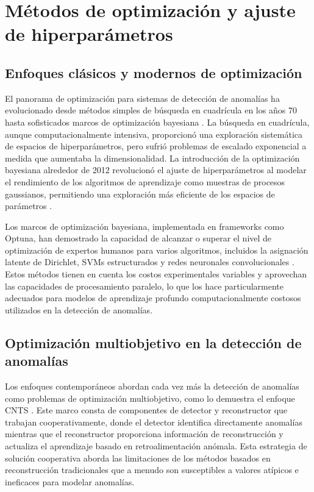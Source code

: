 \section{Métodos de optimización y ajuste de hiperparámetros}
\subsection{Enfoques clásicos y modernos de optimización}

El panorama de optimización para sistemas de detección de anomalías ha evolucionado desde métodos simples de búsqueda en cuadrícula en los años 70 \cite{noauthor_adaptation_nodate} hasta sofisticados marcos de optimización bayesiana \cite{snoek_practical_2012}. La búsqueda en cuadrícula, aunque computacionalmente intensiva, proporcionó una exploración sistemática de espacios de hiperparámetros, pero sufrió problemas de escalado exponencial a medida que aumentaba la dimensionalidad. La introducción de la optimización bayesiana alrededor de 2012 revolucionó el ajuste de hiperparámetros al modelar el rendimiento de los algoritmos de aprendizaje como muestras de procesos gaussianos, permitiendo una exploración más eficiente de los espacios de parámetros \cite{noauthor_adaptation_nodate}.

Los marcos de optimización bayesiana, implementada en frameworks como Optuna, han demostrado la capacidad de alcanzar o superar el nivel de optimización de expertos humanos para varios algoritmos, incluidos la asignación latente de Dirichlet, SVMs estructurados y redes neuronales convolucionales \cite{noauthor_adaptation_nodate}. Estos métodos tienen en cuenta los costos experimentales variables y aprovechan las capacidades de procesamiento paralelo, lo que los hace particularmente adecuados para modelos de aprendizaje profundo computacionalmente costosos utilizados en la detección de anomalías.



\subsection{Optimización multiobjetivo en la detección de anomalías}

Los enfoques contemporáneos abordan cada vez más la detección de anomalías como problemas de optimización multiobjetivo, como lo demuestra el enfoque CNTS \cite{yang_cnts_2023}. Este marco consta de componentes de detector y reconstructor que trabajan cooperativamente, donde el detector identifica directamente anomalías mientras que el reconstructor proporciona información de reconstrucción y actualiza el aprendizaje basado en retroalimentación anómala. Esta estrategia de solución cooperativa aborda las limitaciones de los métodos basados en reconstrucción tradicionales que a menudo son susceptibles a valores atípicos e ineficaces para modelar anomalías.